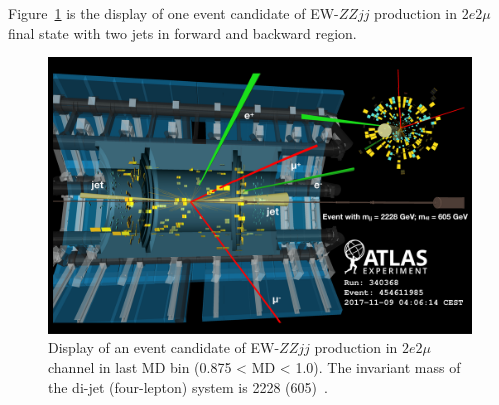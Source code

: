 Figure~\ref{fig:event_display} is the display of one event candidate of EW-$ZZjj$ production in $2e2\mu$ final state with two jets in forward and backward region.
\begin{figure}[!htbp]
\begin{center}
\includegraphics[width=1.0\textwidth]{figures/VBSZZ/fit/resize_340368_454611985_v3.pdf}
\end{center}
\caption{Display of an event candidate of EW-$ZZjj$ production in $2e2\mu$ channel in last MD bin (0.875 < MD < 1.0).
         The invariant mass of the di-jet (four-lepton) system is 2228 (605)~\gev. }
\label{fig:event_display}
\end{figure}

